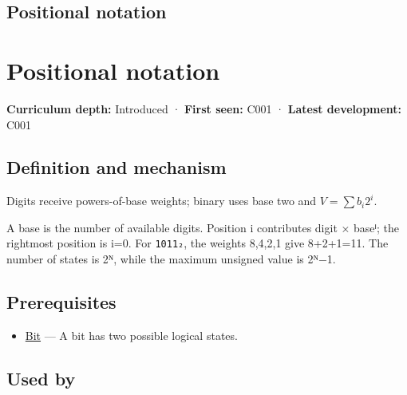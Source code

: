 \hypertarget{appendix-83c3f28f7bda}{}
\section*{Positional notation}
\chapter{Positional notation}\label{appendix-83c3f28f7bda-positional-notation}

\textbf{Curriculum depth:} Introduced · \textbf{First seen:} C001 · \textbf{Latest development:} C001

\section{Definition and mechanism}\label{appendix-83c3f28f7bda-definition-and-mechanism}

Digits receive powers-of-base weights; binary uses base two and \(V=\sum b_i2^i\).

A base is the number of available digits. Position i contributes digit × baseⁱ; the rightmost position is i=0. For \texttt{1011₂}, the weights 8,4,2,1 give 8+2+1=11. The number of states is 2ᴺ, while the maximum unsigned value is 2ᴺ−1.

\section{Prerequisites}\label{appendix-83c3f28f7bda-prerequisites}

\begin{itemize}
\tightlist
\item
  \hyperref[appendix-ddbb69998a2e]{Bit} --- A bit has two possible logical states.
\end{itemize}

\section{Used by}\label{appendix-83c3f28f7bda-used-by}

